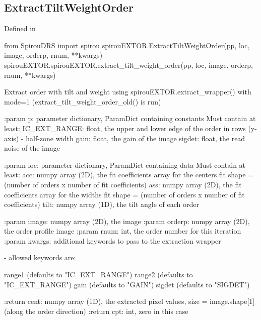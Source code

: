 \begin{minipage}{\textwidth}
\subsection{ExtractTiltWeightOrder}

Defined in \spirouEXTOR{}

\begin{pythonbox}
from SpirouDRS import spirou
spirouEXTOR.ExtractTiltWeightOrder(pp, loc, image, orderp, rnum, **kwargs)
spirouEXTOR.spirouEXTOR.extract_tilt_weight_order(pp, loc, image, orderp, rnum, **kwargs)
\end{pythonbox}

\begin{pythondocstring}
Extract order with tilt and weight using
spirouEXTOR.extract_wrapper() with mode=1
(extract_tilt_weight_order_old() is run)

:param p: parameter dictionary, ParamDict containing constants
    Must contain at least:
            IC_EXT_RANGE: float, the upper and lower edge of the order
                          in rows (y-axis) - half-zone width
            gain: float, the gain of the image
            sigdet: float, the read noise of the image

:param loc: parameter dictionary, ParamDict containing data
        Must contain at least:
            acc: numpy array (2D), the fit coefficients array for
                  the centers fit
                  shape = (number of orders x number of fit coefficients)
            ass: numpy array (2D), the fit coefficients array for
                  the widths fit
                  shape = (number of orders x number of fit coefficients)
            tilt: numpy array (1D), the tilt angle of each order

:param image: numpy array (2D), the image
:param orderp: numpy array (2D), the order profile image
:param rnum: int, the order number for this iteration
:param kwargs: additional keywords to pass to the extraction wrapper

        - allowed keywords are:

        range1  (defaults to "IC_EXT_RANGE")
        range2  (defaults to "IC_EXT_RANGE")
        gain    (defaults to "GAIN")
        sigdet  (defaults to "SIGDET")

:return cent: numpy array (1D), the extracted pixel values,
             size = image.shape[1] (along the order direction)
:return cpt: int, zero in this case
\end{pythondocstring}
\end{minipage}

